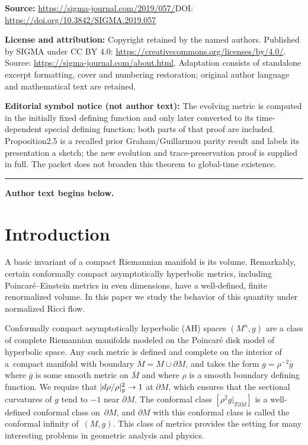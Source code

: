 \documentclass[11pt]{article}
\numberwithin{equation}{section}
\newcommand{\del}{\partial}
\newcommand{\gbar}{\overline{g}}
\newcommand{\Mbar}{\overline{M}}
\begin{document}
\noindent\textbf{Source:} \url{https://sigma-journal.com/2019/057/}\quad DOI: \url{https://doi.org/10.3842/SIGMA.2019.057}\par
\noindent\textbf{License and attribution:} Copyright retained by the named authors. Published by SIGMA under CC BY 4.0: \url{https://creativecommons.org/licenses/by/4.0/}. Source: \url{https://sigma-journal.com/about.html}. Adaptation consists of standalone excerpt formatting, cover and numbering restoration; original author language and mathematical text are retained.\par
\noindent\textbf{Editorial symbol notice (not author text):} The evolving metric is computed in the initially fixed defining function and only later converted to its time-dependent special defining function; both parts of that proof are included. Proposition2.5 is a recalled prior Graham/Guillarmou parity result and labels its presentation a sketch; the new evolution and trace-preservation proof is supplied in full. The packet does not broaden this theorem to global-time existence.\par
\medskip\hrule\medskip\noindent\textbf{Author text begins below.}\par
\setcounter{section}{0}
\setcounter{subsection}{0}
\setcounter{subsubsection}{0}
\setcounter{Theorem}{0}
\setcounter{equation}{0}
\section{Introduction}

A basic invariant of a compact Riemannian manifold is its volume. Remarkably, certain conformally compact
asymptotically hyperbolic metrics, including Poincar\'e--Einstein metrics in even dimensions, have a well-defined,
finite renormalized volume. In this paper we study the behavior of this quantity under normalized Ricci flow.

Conformally compact asymptotically hyperbolic (AH) spaces $(M^n, g)$ are a class of complete Riemannian manifolds modeled on the Poincar\'e disk model of hyperbolic space. Any such metric is defined and complete on the interior of a~compact manifold with boundary $\Mbar = M \cup \partial M$, and takes the form $g = \rho^{-2} \gbar$ where $\gbar$ is some smooth metric on $\Mbar$ and where $\rho$ is a smooth boundary defining function. We require that $|{\rm d}\rho/\rho|^2_g \to 1$ at $\partial M$, which ensures that the sectional curvatures of $g$ tend to $-1$ near $\partial M$. The conformal class $[\rho^2 g |_{T\partial M}]$ is a well-defined conformal class on~$\partial M$, and $\del M$ with this conformal class is called the conformal infinity of~$(M,g)$. This class of metrics provides the setting for many interesting problems in geometric analysis and physics.
\end{document}
